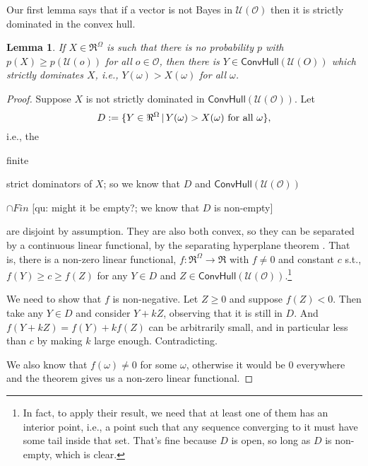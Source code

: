 \documentclass[a4paper]{article}
\newtheorem{lemma}[theorem]{Lemma}
\renewcommand\O{\mathcal{O}}
\newcommand\Uwald{\mathcal{U}} %
\newcommand{\Conv}{\mathsf{ConvHull}}
\newcommand\SetDelimiter[1][]{
	\nonscript\,#1\vert \allowbreak \nonscript\,\mathopen{}}
\providecommand\given{\SetDelimiter}
\renewcommand{\geq}{\geqslant}
\newenvironment{CCM rewritten}
{\begingroup\color{blue}} %
{\endgroup}              %
\begin{document}
	Our first lemma says that if a vector is not Bayes in $\Uwald(\O)$ then it is strictly dominated in the convex hull.
	\begin{lemma}\label{thm:cct:admiss in conv are Bayes in conv}
		If $X\in\Re^\Omega$ is such that there is no probability $p$ with $p(X)\geq p(\Uwald(o))$ for all $o\in\O$, then there is $Y\in\Conv(\Uwald(O))$ which strictly dominates $X$, i.e., $Y(\omega)>X(\omega)$ for all $\omega$.
	\end{lemma}
	\begin{proof}
		Suppose $X$ is not strictly dominated in $\Conv(\Uwald(\O))$. 
		Let $$D:=\{Y\in \Re^\Omega\given Y(\omega)>X(\omega)\text{ for all $\omega$}\},$$ i.e., the \begin{infversion}
			finite
		\end{infversion} strict dominators of $X$; so we know that $D$ and $\Conv(\Uwald(\O))$ \begin{infversion}
			$\cap Fin$ [qu: might it be empty?; we know that $D$ is non-empty]
		\end{infversion}are disjoint by assumption. They are also both convex, so they can be separated by a continuous linear functional, by the separating hyperplane theorem \citep[Theorem 5.61]{aliprantis2006infinite}. %
		That is, there is a non-zero linear functional, $f:\Re^\Omega\to\Re$ with $f\neq 0$ and constant $c$ s.t.,  $f(Y)\geq c \geq f(Z)$ for any $Y\in D$ and $Z\in \Conv(\Uwald(\O))$.\footnote{In fact, to apply their result, we need that at least one of them has an interior point, i.e., a point such that any sequence converging to it must have some tail inside that set. That's fine because $D$ is open, so long as $D$ is non-empty, which is clear.
	}
		
		We need to show that $f$ is non-negative. Let $Z\geq 0$ and suppose $f(Z)<0$. Then take any $Y\in D$ and consider $Y+kZ$, observing that it is still in $D$. And $f(Y+kZ)=f(Y)+kf(Z)$ can be arbitrarily small, and in particular less than $c$ by making $k$ large enough. Contradicting. 
		
		We also know that $f(\omega)\neq 0$ for some $\omega$, otherwise it would be $0$ everywhere and the theorem gives us a non-zero linear functional. 
		

\end{proof}
\end{document}
